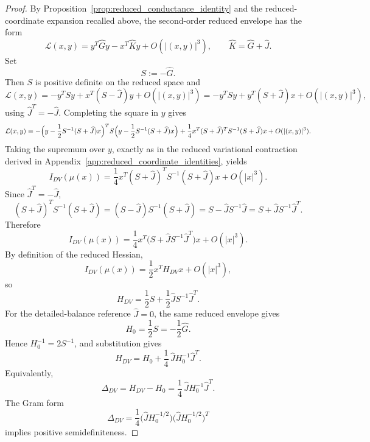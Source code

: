 \documentclass[11pt,a4paper]{article}
\numberwithin{equation}{section}
\theoremstyle{thmcompact}
\theoremstyle{remark}
\begin{document}
\begin{proof}
By Proposition~\ref{prop:reduced_conductance_identity} and the reduced-coordinate expansion recalled above, the second-order reduced envelope has the form
\begin{equation}
\mathcal L(x,y)=y^T\widehat G y-x^T\widehat K y+O(|(x,y)|^3),
\qquad
\widehat K=\widehat G+\widehat J.
\end{equation}
Set
\begin{equation}
S:=-\widehat G.
\end{equation}
Then \(S\) is positive definite on the reduced space and
\begin{equation}
\mathcal L(x,y)
=
-y^TSy+x^T(S-\widehat J)y+O(|(x,y)|^3)
=
-y^TSy+y^T(S+\widehat J)x+O(|(x,y)|^3),
\end{equation}
using \(\widehat J^T=-\widehat J\). Completing the square in \(y\) gives
\begin{equation}
\mathcal L(x,y)
=
-\Bigl(y-\frac12S^{-1}(S+\widehat J)x\Bigr)^TS\Bigl(y-\frac12S^{-1}(S+\widehat J)x\Bigr)
+\frac14 x^T(S+\widehat J)^TS^{-1}(S+\widehat J)x
+O(|(x,y)|^3).
\end{equation}
Taking the supremum over \(y\), exactly as in the reduced variational contraction derived in Appendix~\ref{app:reduced_coordinate_identities}, yields
\begin{equation}
I_{DV}(\mu(x))
=
\frac14 x^T(S+\widehat J)^TS^{-1}(S+\widehat J)x+O(|x|^3).
\end{equation}
Since \(\widehat J^T=-\widehat J\),
\begin{equation}
(S+\widehat J)^TS^{-1}(S+\widehat J)
=
(S-\widehat J)S^{-1}(S+\widehat J)
=
S-\widehat J S^{-1}\widehat J
=
S+\widehat J S^{-1}\widehat J^T.
\end{equation}
Therefore
\begin{equation}
I_{DV}(\mu(x))
=
\frac14 x^T\bigl(S+\widehat J S^{-1}\widehat J^T\bigr)x+O(|x|^3).
\end{equation}
By definition of the reduced Hessian,
\begin{equation}
I_{DV}(\mu(x))=\frac12 x^T H_{DV}x+O(|x|^3),
\end{equation}
so
\begin{equation}
H_{DV}=\frac12 S+\frac12\widehat J S^{-1}\widehat J^T.
\end{equation}
For the detailed-balance reference \(\widehat J=0\), the same reduced envelope gives
\begin{equation}
H_0=\frac12S=-\frac12\widehat G.
\end{equation}
Hence \(H_0^{-1}=2S^{-1}\), and substitution gives
\begin{equation}
H_{DV}=H_0+\frac14\,\widehat J H_0^{-1}\widehat J^T.
\end{equation}
Equivalently,
\begin{equation}
\Delta_{DV}=H_{DV}-H_0=\frac14\,\widehat J H_0^{-1}\widehat J^T.
\end{equation}
The Gram form
\begin{equation}
\Delta_{DV}=\frac14\bigl(\widehat J H_0^{-1/2}\bigr)\bigl(\widehat J H_0^{-1/2}\bigr)^T
\end{equation}
implies positive semidefiniteness.
\end{proof}
\end{document}
